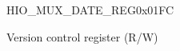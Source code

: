 \begin{register}{H}{IO\_MUX\_DATE\_REG}{0x01FC}\label{regdesc:IOMUXDATEREG}
%
%
\regnewline%
\begin{regdesc}\begin{reglist}
\label{fielddesc:IOMUXREGDATE}\item [IO\_MUX\_REG\_DATE] Version control register (R/W)
\end{reglist}\end{regdesc}
\end{register}


